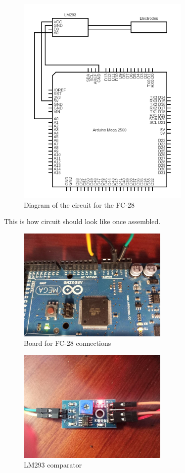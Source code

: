 \begin{figure}[H]
    \centering
    \includegraphics[width=0.75\textwidth]{fig/fc28-scheme-circuit.png}
    \caption{Diagram of the circuit for the FC-28}
    \label{fig:fc28-scheme-circuit}
\end{figure}


This is how circuit should look like once assembled.
	\begin{figure}[H]
		\centering
		\includegraphics[width=0.65\textwidth]{fig/fc28-circuit1.jpg}
		\caption{Board for FC-28 connections}
	\end{figure}
	\hfill
	\begin{figure}[H]
		\centering
		\includegraphics[width=0.65\textwidth]{fig/fc28-circuit2.jpg}
		\caption{LM293 comparator}
	\end{figure}

